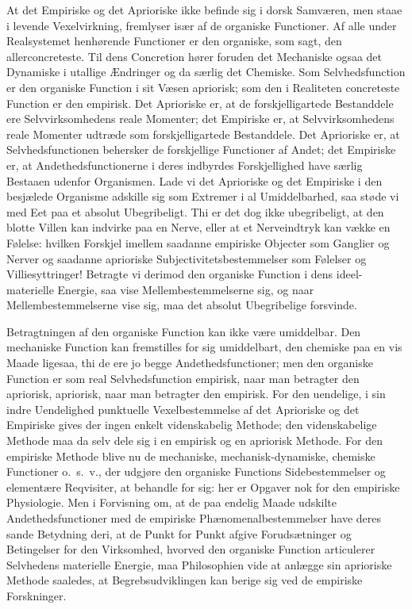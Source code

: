 \documentclass[12pt]{book}
\newcommand{\opage}[1]{\marginnote{\footnotesize\textit{[#1]}}}
\begin{document}
At det Empiriske og det Aprioriske ikke befinde sig i dorsk Samværen, men staae i levende
Vexelvirkning, fremlyser især af de organiske Functioner. Af alle under Realsystemet henhørende
Functioner er den organiske, som sagt, den allerconcreteste. Til dens Concretion hører foruden
det Mechaniske ogsaa det Dynamiske i utallige Ændringer og da særlig det Chemiske. Som
Selvhedsfunction er den organiske Function i sit Væsen apriorisk; som den i Realiteten
concreteste Function er den empirisk. Det Aprioriske er, at de forskjelligartede Bestanddele ere
Selvvirksomhedens reale Momenter; det Empiriske er, at Selvvirksomhedens reale Momenter udtræde
som forskjelligartede Bestanddele. Det Aprioriske er, at Selvhedsfunctionen behersker de
forskjellige Functioner af Andet; det Empiriske er, at Andethedsfunctionerne i deres indbyrdes
Forskjellighed have særlig Bestaaen udenfor Organismen. Lade vi det Aprioriske og det Empiriske i
den besjælede Organisme adskille sig som Extremer i al Umiddelbarhed, saa støde vi med Eet paa et
absolut Ubegribeligt. Thi er det dog ikke ubegribeligt, at den blotte Villen kan indvirke paa en
Nerve, eller at et Nerveindtryk kan vække en Følelse: hvilken Forskjel imellem saadanne empiriske
Objecter som Ganglier og Nerver og saadanne aprioriske Subjectivitetsbestemmelser som Følelser og
Villiesyttringer! Betragte vi derimod den organiske Function i dens ideel-materielle Energie, saa
vise Mellembestemmelserne sig, og naar Mellembestemmelserne vise sig, maa det absolut
Ubegribelige forsvinde.

Betragtningen af den organiske Function kan ikke være umiddelbar. Den mechaniske Function kan
fremstilles for sig umiddelbart, den chemiske paa en vis Maade ligesaa, thi de ere jo begge
Andethedsfunctioner; men den organiske Function er som real Selvhedsfunction empirisk, naar man
betragter den
\opage{408} apriorisk, apriorisk, naar man betragter den empirisk. For den uendelige, i sin indre Uendelighed
punktuelle Vexelbestemmelse af det Aprioriske og det Empiriske gives der ingen enkelt
videnskabelig Methode; den videnskabelige Methode maa da selv dele sig i en empirisk og en
apriorisk Methode. For den empiriske Methode blive nu de mechaniske, mechanisk-dynamiske,
chemiske Functioner o.\ s.\ v., der udgjøre den organiske Functions Sidebestemmelser og
elementære Reqvisiter, at behandle for sig: her er Opgaver nok for den empiriske Physiologie. Men
i Forvisning om, at de paa endelig Maade udskilte Andethedsfunctioner med de empiriske
Phænomenalbestemmelser have deres sande Betydning deri, at de Punkt for Punkt afgive
Forudsætninger og Betingelser for den Virksomhed, hvorved den organiske Function articulerer
Selvhedens materielle Energie, maa Philosophien vide at anlægge sin aprioriske Methode saaledes,
at Begrebsudviklingen kan berige sig ved de empiriske Forskninger.
\end{document}
